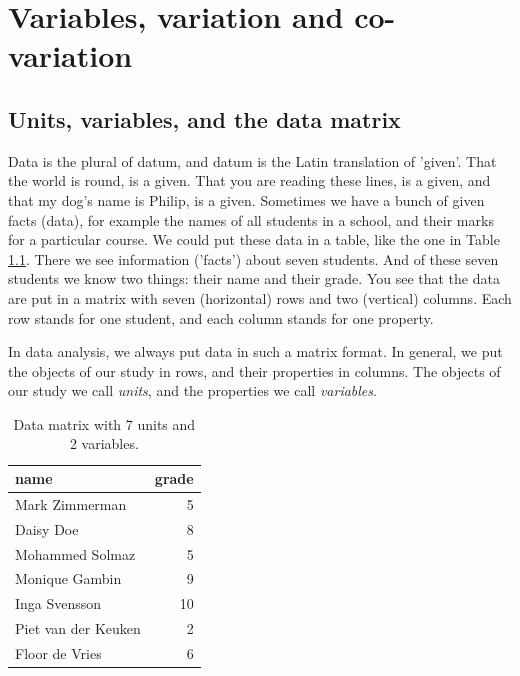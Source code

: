 \documentclass[]{book}\usepackage[]{graphicx}\usepackage[]{color}
\begin{document}
\tableofcontents



\mainmatter
\pagestyle{plain}





\chapter{Variables, variation and co-variation} \label{chap:intro}


\section{Units, variables, and the data matrix}



Data is the plural of datum, and datum is the Latin translation of 'given'. That the world is round, is a given. That you are reading these lines, is a given, and that my dog's name is Philip, is a given. Sometimes we have a bunch of given facts (data), for example the names of all students in a school, and their marks for a particular course. We could put these data in a table, like the one in Table \ref{tab:data_1}. There we see information ('facts') about seven students. And of these seven students we know two things: their name and their grade. You see that the data are put in a matrix with seven (horizontal) rows and two (vertical) columns. Each row stands for one student, and each column stands for one property.

In data analysis, we always put data in such a matrix format. In general, we put the objects of our study in rows, and their properties in columns. The objects of our study we call \textit{units}, and the properties we call \textit{variables}.

\begin{table}[ht]
\centering
\caption{Data matrix with 7 units and 2 variables.} 
\label{tab:data_1}
\begin{tabular}{lr}
  \hline
name & grade \\ 
  \hline
Mark Zimmerman & 5 \\ 
  Daisy Doe & 8 \\ 
  Mohammed Solmaz & 5 \\ 
  Monique Gambin & 9 \\ 
  Inga Svensson & 10 \\ 
  Piet van der Keuken & 2 \\ 
  Floor de Vries & 6 \\ 
   \hline
\end{tabular}
\end{table}
\end{document}
